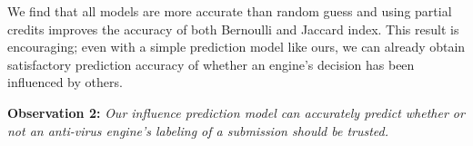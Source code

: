 We find that all models are more accurate than random guess
and using partial credits improves the accuracy of both Bernoulli and Jaccard index.
This result is encouraging;
even with a simple prediction model like ours, we can already obtain satisfactory prediction accuracy of whether an engine's decision has been influenced by others.

{\bf Observation 2:} 
{\em Our influence prediction model can accurately predict whether or not an anti-virus engine's labeling of a submission should be trusted. }




